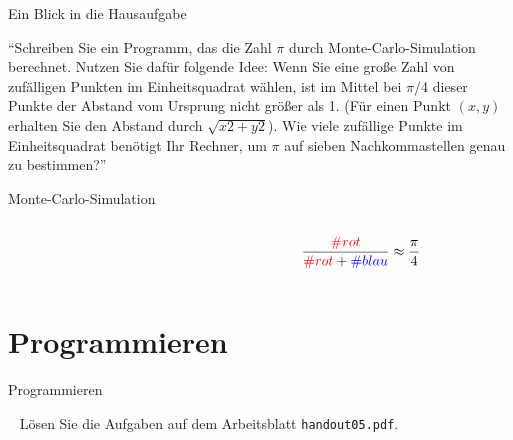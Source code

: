 \documentclass[10pt]{beamer} %
\begin{document}
\begin{frame}{Ein Blick in die Hausaufgabe}

	\enquote{Schreiben Sie ein Programm, das die Zahl $\pi$ durch Monte-Carlo-Simulation berechnet.
	Nutzen Sie dafür folgende Idee: Wenn Sie eine große Zahl von zufälligen Punkten im Einheitsquadrat wählen, ist im Mittel bei $\pi$/4 dieser Punkte der Abstand vom Ursprung nicht
	größer als 1. (Für einen Punkt $(x, y)$ erhalten Sie den Abstand durch $\sqrt{x2 + y2}$).
	Wie viele zufällige Punkte im Einheitsquadrat benötigt Ihr Rechner, um $\pi$ auf sieben Nachkommastellen genau zu bestimmen?}

\end{frame}

\def\x{0}
\def\y{0}
\def\k{0}
\def\radius{5}


\begin{frame}{Monte-Carlo-Simulation}
	
	\begin{columns}
		\begin{column}{0.6\textwidth}
			\centering
		\end{column}
		\begin{column}{0.4\textwidth}
			\[\dfrac{\color{red} \#rot}{{\color{red} \#rot} + {\color{blue} \#blau}} \approx \dfrac{\pi}{4}\]
		\end{column}
	\end{columns}
\end{frame}

\section{Programmieren}

\begin{frame}{Programmieren}

	\begin{task}{~}
		Lösen Sie die Aufgaben auf dem Arbeitsblatt \texttt{handout05.pdf}.
	\end{task}

\end{frame}
\end{document}
